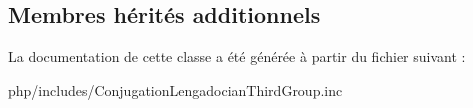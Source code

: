 \subsection*{Membres hérités additionnels}


La documentation de cette classe a été générée à partir du fichier suivant \+:\begin{DoxyCompactItemize}
\item 
php/includes/Conjugation\+Lengadocian\+Third\+Group.\+inc\end{DoxyCompactItemize}
